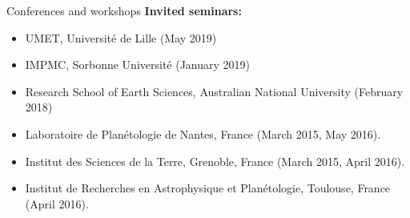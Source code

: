 \documentclass{cv}
\begin{document}
\begin{rubrique}{Conferences and workshops}
\textbf{Invited seminars:}
	\begin{itemize}[parsep=-2pt]
	\item UMET, Universit\'e de Lille (May 2019)
	\item IMPMC, Sorbonne Universit\'e (January 2019)
	\item Research School of Earth Sciences, Australian National University (February 2018)
	\item Laboratoire de Plan\'etologie de Nantes, France (March 2015, May 2016).
	\item Institut des Sciences de la Terre, Grenoble, France (March 2015, April 2016).
	\item Institut de Recherches en Astrophysique et Plan\'etologie, Toulouse, France (April 2016).
	\end{itemize}
\end{rubrique}
\end{document}
